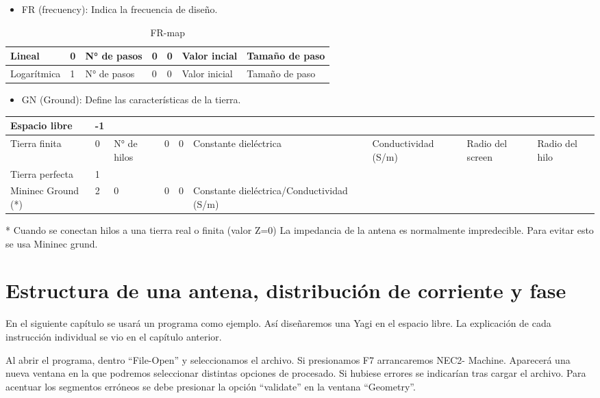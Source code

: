 \documentclass[12pt]{article}
\begin{document}
\begin{itemize}
    \item FR (frecuency): Indica la frecuencia de diseño.
\end{itemize}

\begin{table}[H]
    \centering
    \begin{tabular}{|l|l|l|l|l|l|l|}
	\hline
	Lineal&0&N° de pasos&0&0&Valor incial&Tamaño de paso\\\hline
	Logar\'itmica&1&N° de pasos&0&0&Valor inicial&Tamaño de paso\\\hline
    \end{tabular}
    \caption{FR-map}
\end{table}

\begin{itemize}
    \item GN (Ground): Define las caracter\'isticas de la tierra.
\end{itemize}

\begin{table}[H]
    \centering
    \begin{tabularx}{\textwidth}{|X|X|X|X|X|X|X|X|X|}
	\hline
	Espacio libre&-1&&&&&&&\\\hline
	Tierra finita&0&N° de hilos&0&0&Cons\-tante diel\'ectrica&Conduc\-tividad (S/m)&Radio del screen&Radio del hilo\\ \hline
	Tierra perfecta&1&&&&&&&\\\hline
	Mininec Ground (*)&2&0&0&0&Con\-stante diel\'ectrica/Conductividad (S/m)&&&\\\hline
    \end{tabularx}
    \raggedright 
    * Cuando se conectan hilos a una tierra real o finita (valor Z=0) La impedancia de la antena es normalmente impredecible. Para evitar esto se usa Mininec grund.
\end{table}

\section{Estructura de una antena, distribuci\'on de corriente y fase}

En el siguiente capítulo se usar\'a un programa como ejemplo. Así diseñaremos una Yagi en el espacio libre. La explicación de cada instrucción individual se vio en el capítulo anterior.

Al abrir el programa, dentro “File-Open” y seleccionamos el archivo. Si presionamos F7 arrancaremos NEC2- Machine. Aparecer\'a una nueva ventana en la que podremos seleccionar distintas opciones de procesado. Si hubiese errores se indicarían tras cargar el archivo. Para acentuar los segmentos erróneos se debe presionar la opci\'on ``validate'' en la ventana ``Geometry''.
\end{document}
